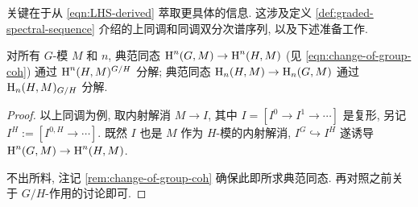 关键在于从 \eqref{eqn:LHS-derived} 萃取更具体的信息. 这涉及定义 \ref{def:graded-spectral-sequence} 介绍的上同调和同调双分次谱序列, 以及下述准备工作.

\begin{lemma}\label{prop:LHS-action-aux}
	对所有 $G$-模 $M$ 和 $n$, 典范同态 $\operatorname{H}^n(G, M) \to \operatorname{H}^n(H, M)$ (见 \eqref{eqn:change-of-group-coh}) 通过 $\operatorname{H}^n(H, M)^{G/H}$ 分解; 典范同态 $\operatorname{H}_n(H, M) \to \operatorname{H}_n(G, M)$ 通过 $\operatorname{H}_n(H, M)_{G/H}$ 分解.
\end{lemma}
\begin{proof}
	以上同调为例, 取内射解消 $M \to I$, 其中 $I = [I^0 \to I^1 \to \cdots]$ 是复形, 另记 $I^H := [I^{0, H} \to \cdots]$. 既然 $I$ 也是 $M$ 作为 $H$-模的内射解消, $I^G \hookrightarrow I^H$ 遂诱导 $\operatorname{H}^n(G, M) \to \operatorname{H}^n(H, M)$.
	
	不出所料, 注记 \ref{rem:change-of-group-coh} 确保此即所求典范同态. 再对照之前关于 $G/H$-作用的讨论即可.
\end{proof}

